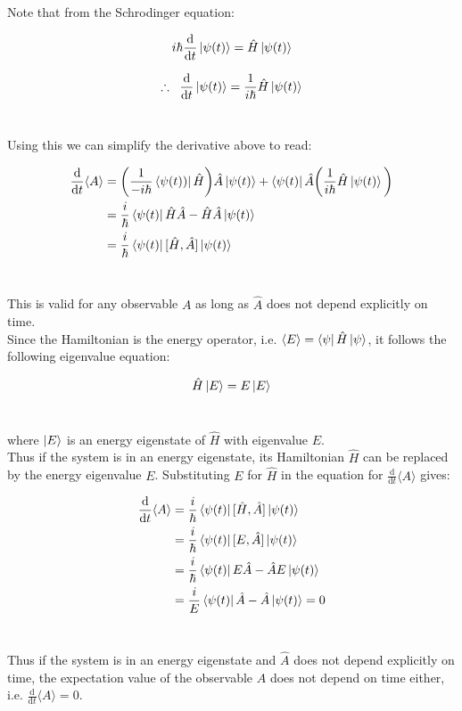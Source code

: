 \documentclass[9pt]{extarticle}
\renewcommand{\d}{\text{d}}
\newcommand{\ddt}[1]{\frac{\d #1}{\d t}}
\begin{document}
\begin{multicols*}{2}
Note that from the Schrodinger equation:

$$i\hbar \ddt{} \ket{\psi(t)} = \hat H \ket{\psi(t)}$$

$$\therefore \;\; \ddt{} \ket{\psi(t)} = \frac{1}{i\hbar} \hat H \ket{\psi(t)}$$ \ 

Using this we can simplify the derivative above to read:

$$
\begin{aligned}
	\ddt{} \langle A \rangle &= \bigg( \frac{1}{-i\hbar} \bra{\psi(t))} \hat H \bigg) \hat A \ket{\psi(t)} + \bra{\psi(t)} \hat A \bigg( \frac{1}{i\hbar} \hat H \ket{\psi(t)} \bigg) \\ 
	&= \frac i \hbar \bra{\psi(t)} \hat H \hat A - \hat H \hat A \ket{\psi(t)} \\ 
	&= \frac i \hbar \bra{\psi(t)} [\hat H, \hat A] \ket{\psi(t)}
\end{aligned}
$$ \ 

This is valid for any observable $A$ as long as $\hat A$ does not depend explicitly on time. \\ 

Since the Hamiltonian is the energy operator, i.e. $\langle E \rangle = \bra{\psi} \hat H \ket{\psi}$, it follows the following eigenvalue equation:

$$\hat H \ket{E} = E \ket{E}$$ \ 

where $\ket{E}$ is an energy eigenstate of $\hat H$ with eigenvalue $E$. \\ 

Thus if the system is in an energy eigenstate, its Hamiltonian $\hat H$ can be replaced by the energy eigenvalue $E$. Substituting $E$ for $\hat H$ in the equation for $\ddt{} \langle A \rangle$ gives:

$$
\begin{aligned}
	\ddt{} \langle A \rangle &= \frac i \hbar \bra{\psi(t)} [\hat H, \hat A] \ket{\psi(t)} \\ 
	&= \frac i \hbar \bra{\psi(t)} [E,\hat A] \ket{\psi(t)} \\ 
	&= \frac i \hbar \bra{\psi(t)} E \hat A - \hat A E \ket{\psi(t)} \\ 
	&= \frac i E \bra{\psi(t)} \hat A -  \hat A \ket{\psi(t)}  = 0\\ 
\end{aligned}
$$ \ 

Thus if the system is in an energy eigenstate and $\hat A$ does not depend explicitly on time, the expectation value of the observable $A$ does not depend on time either, i.e. $\ddt{} \langle A \rangle =0$. \\ 


\end{multicols*}
\end{document}
